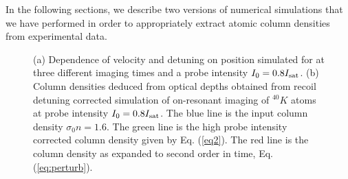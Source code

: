 In the following sections, we describe two versions of numerical simulations that we have performed in order to appropriately extract atomic column densities from experimental data.  
%
\begin{figure}
\caption{(a) Dependence of velocity and detuning on position simulated for \K{} at three different imaging times and a probe intensity $I_0=0.8 I_{\rm sat}$. (b) Column densities deduced from optical depths obtained from recoil detuning corrected simulation of on-resonant imaging of $^{40}K$ atoms at probe intensity $I_0=0.8 I_{\rm sat}$. The blue line is the input column density $\sigma_0 n=1.6$. The green line is the high probe intensity corrected column density given by Eq. (\ref{eq2}). The red line is the column density as expanded to second order in time, Eq. (\ref{eq:perturb}).}
\label{fig:expos}
\end{figure}
